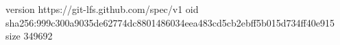 version https://git-lfs.github.com/spec/v1
oid sha256:999c300a9035de62774dc8801486034eea483cd5cb2ebff5b015d734ff40e915
size 349692

